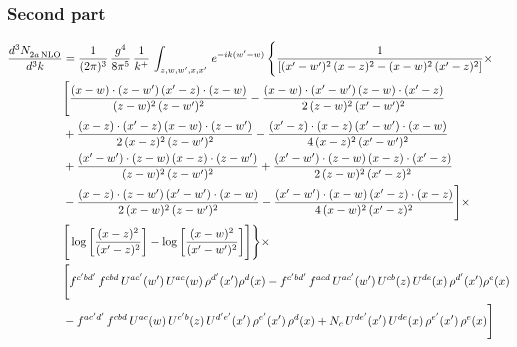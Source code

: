 \documentclass[9pt]{article}
\numberwithin{equation}{section}
\begin{document}
\subsubsection{Second part}
\begin{align}
    \frac{d^{3}N_{2a\,\rm NLO}^{\rm}}{d^{3}k}  & =  \frac{1}{(2\pi)^{3}}\, \frac{g^{4}}{8\pi^{5}}\,\frac{1}{k^{+}}\,\int_{z,w,w^{\prime},x,x'}\, e^{-ik(w^{\prime}-w)}\, \Bigg\{ \frac{1}{\left[(x'-w')^{2}\, (x-z)^{2}-(x-w)^{2}\, (x'-z)^{2}\right]}\times\,\notag \\ & \Bigg[\frac{(x-w)\cdot (z-w')\, (x'-z)\cdot (z-w)}{(z-w)^{2}\,(z-w')^{2}}-\frac{(x-w)\cdot (x'-w')\, (z-w)\cdot (x'-z)}{2\, (z-w)^{2}\, (x'-w')^{2}}\notag \\ & + \frac{(x-z)\cdot (x'-z)\, (x-w)\cdot (z-w')}{2\, (x-z)^{2}\, (z-w')^{2}}-\frac{(x'-z)\cdot (x-z)\, (x'-w')\cdot (x-w)}{4\, (x-z)^{2}\, (x'-w')^{2}}\notag \\ & + \frac{(x'-w')\cdot (z-w)\, (x-z)\cdot (z-w')}{(z-w)^{2}\,(z-w')^{2}}+\frac{(x'-w')\cdot (z-w)\, (x-z)\cdot (x'-z)}{2\, (z-w)^{2}\, (x'-z)^{2}}\notag \\ & - \frac{(x-z)\cdot (z-w')\, (x'-w')\cdot (x-w)}{2\, (x-w)^{2}\, (z-w')^{2}} -\frac{(x'-w')\cdot (x-w)\, (x'-z)\cdot (x-z)}{4\, (x-w)^{2}\, (x'-z)^{2}}\Bigg]\times\notag \\ &  \Bigg[\log{\left[\frac{(x-z)^{2}}{ (x'-z)^{2}}\right]}-\log{\left[\frac{(x-w)^{2}}{(x'-w')^{2}}\right]}\Bigg]\Bigg\} \times\, \notag \\ & \Bigg[f^{c'bd'}\,f^{cbd}\, U^{ac'}(w')\,U^{ac}(w)\,\rho^{d'}(x')\rho^{d}(x)- f^{c'bd'}\,f^{acd}\,U^{ac'}(w')\,U^{cb}(z)\,U^{de}(x)\,\rho^{d'}(x')\rho^{e}(x) \notag \\ & -f^{ac'd'}\,f^{cbd}\,U^{ac}(w)\,U^{c'b}(z)\,U^{d'e'}(x')\,\rho^{e'}(x')\,\rho^{d}(x) +N_{c}\,U^{de'}(x')\,U^{de}(x)\,\rho^{e'}(x')\,\rho^{e}(x)\Bigg]
\end{align}
\end{document}
